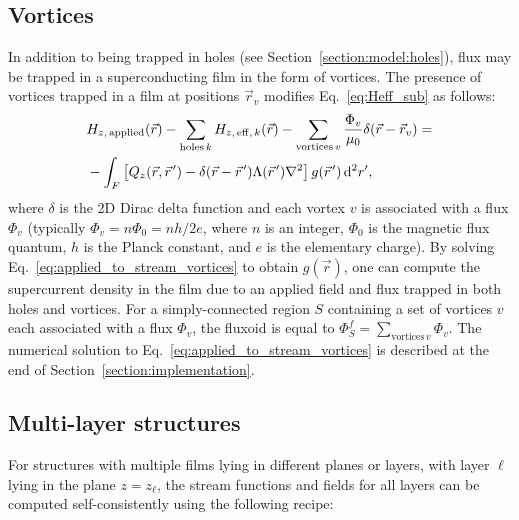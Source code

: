 \documentclass[final,3p,times,twocolumn]{elsarticle}
\newcommand{\pvec}[1]{\vec{#1}\mkern2mu\vphantom{#1}}
\newcounter{bla}
\begin{document}
\subsection{Vortices}
\label{section:model:vortices}
In addition to being trapped in holes (see Section~\ref{section:model:holes}), flux may be trapped in a superconducting film in the form of vortices. The presence of vortices trapped in a film at positions $\vec{r}_v$ modifies Eq.~\ref{eq:Heff_sub} as follows:
\begin{align}
\begin{split}
    \label{eq:applied_to_stream_vortices}
    & H_{z,\,\mathrm{applied}}(\vec{r}) - \sum_{\mathrm{holes}\,k} H_{z,\,\mathrm{eff},\,k}(\vec{r}) - \sum_{\mathrm{vortices}\,v}\frac{\Phi_v}{\mu_0}\delta(\vec{r}-\vec{r}_v)
    = \\
    &-\int_F\left[
        Q_z(\vec{r},\pvec{r}')-\delta(\vec{r}-\pvec{r}')\Lambda(\pvec{r}')\nabla^2\right
    ]g(\pvec{r}')\,\mathrm{d}^2r',
\end{split}
\end{align}
where $\delta$ is the 2D Dirac delta function and each vortex $v$ is associated with a flux $\Phi_v$ (typically $\Phi_v=n\Phi_0=nh/2e$, where $n$ is an integer, $\Phi_0$ is the magnetic flux quantum, $h$ is the Planck constant, and $e$ is the elementary charge). By solving Eq.~\ref{eq:applied_to_stream_vortices} to obtain $g(\vec{r})$, one can compute the supercurrent density in the film due to an applied field and flux trapped in both holes and vortices. For a simply-connected region $S$ containing a set of vortices $v$ each associated with a flux $\Phi_v$, the fluxoid is equal to $\Phi^f_S=\sum_{\mathrm{vortices}\,v}\Phi_v$. The numerical solution to Eq.~\ref{eq:applied_to_stream_vortices} is described at the end of Section~\ref{section:implementation}.

\subsection{Multi-layer structures}
\label{section:model:multilayer}

For structures with multiple films lying in different planes or layers, with layer $\ell$ lying in the plane $z=z_\ell$,
the stream functions and fields for all layers can be computed self-consistently using the following recipe:
\end{document}
